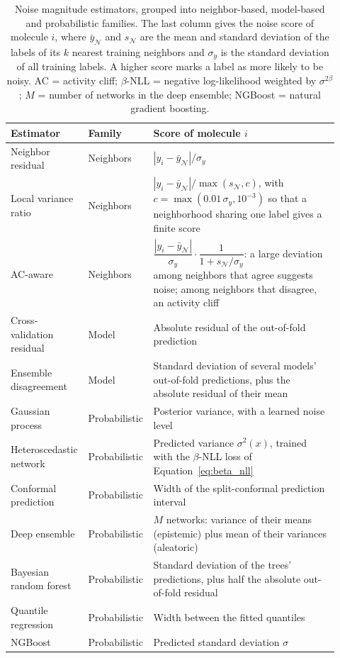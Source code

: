 \begin{table}[htbp]
\centering
\small
\caption[Noise magnitude estimators.]{Noise magnitude estimators, grouped into neighbor-based, model-based and probabilistic families. The last column gives the noise score of molecule $i$, where $\bar y_{\mathcal{N}}$ and $s_{\mathcal{N}}$ are the mean and standard deviation of the labels of its $k$ nearest training neighbors and $\sigma_y$ is the standard deviation of all training labels. A higher score marks a label as more likely to be noisy. AC = activity cliff; $\beta$-NLL = negative log-likelihood weighted by $\sigma^{2\beta}$; $M$ = number of networks in the deep ensemble; NGBoost = natural gradient boosting.}
\label{tab:noise_estimators}
\begin{adjustbox}{max width=\textwidth}
\begin{tabular}{@{}P{0.2\linewidth}P{0.15\linewidth}P{0.57\linewidth}@{}}
\toprule
Estimator & Family & Score of molecule $i$ \\
\midrule
Neighbor residual & Neighbors & $|y_i - \bar y_{\mathcal{N}}| / \sigma_y$ \\
Local variance ratio & Neighbors & $|y_i - \bar y_{\mathcal{N}}| / \max(s_{\mathcal{N}}, c)$, with $c = \max(0.01\,\sigma_y, 10^{-3})$ so that a neighborhood sharing one label gives a finite score \\
AC-aware & Neighbors & $\dfrac{|y_i - \bar y_{\mathcal{N}}|}{\sigma_y} \cdot \dfrac{1}{1 + s_{\mathcal{N}}/\sigma_y}$: a large deviation among neighbors that agree suggests noise; among neighbors that disagree, an activity cliff \citep{Dablander2023} \\
Cross-validation residual & Model & Absolute residual of the out-of-fold prediction \\
Ensemble disagreement & Model & Standard deviation of several models' out-of-fold predictions, plus the absolute residual of their mean \\
Gaussian process & Probabilistic & Posterior variance, with a learned noise level \citep{gauche} \\
Heteroscedastic network & Probabilistic & Predicted variance $\sigma^2(x)$, trained with the $\beta$-NLL loss of Equation~\ref{eq:beta_nll} \citep{Seitzer2022} \\
Conformal prediction & Probabilistic & Width of the split-conformal prediction interval \citep{Shafer2008} \\
Deep ensemble & Probabilistic & $M$ networks: variance of their means (epistemic) plus mean of their variances (aleatoric) \citep{lakshminarayanan2017} \\
Bayesian random forest & Probabilistic & Standard deviation of the trees' predictions, plus half the absolute out-of-fold residual \citep{taddy2015} \\
Quantile regression & Probabilistic & Width between the fitted quantiles \\
NGBoost & Probabilistic & Predicted standard deviation $\sigma$ \citep{Duan2020} \\
\bottomrule
\end{tabular}
\end{adjustbox}
\end{table}

